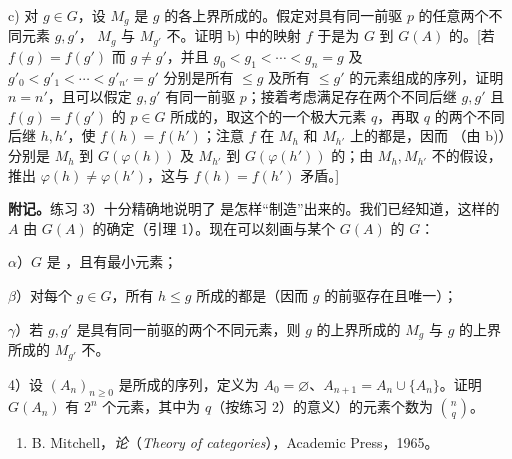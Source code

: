 c) 对 $g\in G$，设 $M_g$ 是 $g$ 的各上界所成的。假定对具有同一前驱 $p$ 的任意两个不同元素 $g,g'$， $M_g$ 与 $M_{g'}$ 不。证明 b) 中的映射 $f$ 于是为 $G$ 到 $G(A)$ 的。[若 $f(g)=f(g')$ 而 $g\ne g'$，并且 $g_0<g_1<\cdots<g_n=g$ 及 $g'_0<g'_1<\cdots<g'_{n'}=g'$ 分别是所有 $\leq g$ 及所有 $\leq g'$ 的元素组成的序列，证明 $n=n'$，且可以假定 $g,g'$ 有同一前驱 $p$；接着考虑满足存在两个不同后继 $g,g'$ 且 $f(g)=f(g')$ 的 $p\in G$ 所成的，取这个的一个极大元素 $q$，再取 $q$ 的两个不同后继 $h,h'$，使 $f(h)=f(h')$；注意 $f$ 在 $M_h$ 和 $M_{h'}$ 上的都是，因而
（由 b)）分别是 $M_h$ 到 $G(\varphi(h))$ 及 $M_{h'}$ 到 $G(\varphi(h'))$ 的；由 $M_h,M_{h'}$ 不的假设，推出 $\varphi(h)\ne\varphi(h')$，这与 $f(h)=f(h')$ 矛盾。]

\textbf{附记。}练习 3）十分精确地说明了 是怎样“制造”出来的。我们已经知道，这样的 $A$ 由 $G(A)$ 的确定（引理 1）。现在可以刻画与某个 $G(A)$ 的 $G$：

$\alpha$）$G$ 是 ，且有最小元素；

$\beta$）对每个 $g\in G$，所有 $h\leq g$ 所成的都是（因而 $g$ 的前驱存在且唯一）；

$\gamma$）若 $g,g'$ 是具有同一前驱的两个不同元素，则 $g$ 的上界所成的 $M_g$ 与 $g$ 的上界所成的 $M_{g'}$ 不。

4）设 $(A_n)_{n\geq0}$ 是所成的序列，定义为 $A_0=\varnothing$、$A_{n+1}=A_n\cup\{A_n\}$。证明 $G(A_n)$ 有 $2^n$ 个元素，其中为 $q$（按练习 2）的意义）的元素个数为 $\binom nq$。

\begin{enumerate}
\item[{[1]}] B. Mitchell，\textit{论}（\textit{Theory of categories}），Academic Press，1965。
\end{enumerate}
